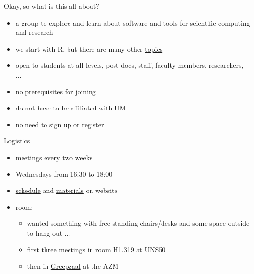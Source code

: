 \documentclass[t,12pt]{beamer}
\begin{document}
\begin{frame}{Okay, so what is this all about?}

\begin{itemize}
   \item a group to explore and learn about software and tools for scientific computing and research
   \item we start with R, but there are many other \href{https://wviechtb.github.io/scrum-club/topics.html}{topics}
   \item open to students at all levels, post-docs, staff, faculty members, researchers, ...
   \item no prerequisites for joining
   \item do not have to be affiliated with UM
   \item no need to sign up or register
\end{itemize}

\end{frame}



\begin{frame}{Logistics}

\begin{itemize}
   \item meetings every two weeks
   \item Wednesdays from 16:30 to 18:00
   \item \href{https://wviechtb.github.io/scrum-club/schedule.html}{schedule} and \href{https://wviechtb.github.io/scrum-club/materials/materials.html}{materials} on website
   \item room:
   \begin{itemize}
      \item wanted something with free-standing chairs/desks and some space outside to hang out ...
      \item first three meetings in room H1.319 at UNS50
      \item then in \href{http://www.mumcplattegrond.nl/\#map/d99_d26}{Greepzaal} at the AZM
   \end{itemize}
\end{itemize}

\end{frame}

\end{document}

